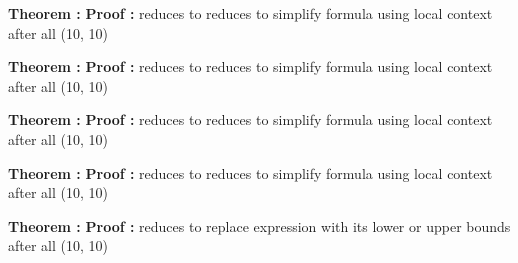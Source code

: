 {\bf Theorem :}
{\bf Proof :}
reduces to
reduces to
simplify formula using local context
after all
\framebox(10, 10){} 

\pagebreak

{\bf Theorem :}
{\bf Proof :}
reduces to
reduces to
simplify formula using local context
after all
\framebox(10, 10){} 

\pagebreak

{\bf Theorem :}
{\bf Proof :}
reduces to
reduces to
simplify formula using local context
after all
\framebox(10, 10){} 

\pagebreak

{\bf Theorem :}
{\bf Proof :}
reduces to
reduces to
simplify formula using local context
after all
\framebox(10, 10){} 

\pagebreak

{\bf Theorem :}
{\bf Proof :}
reduces to
replace expression with its lower or upper bounds
after all
\framebox(10, 10){} 

\pagebreak

